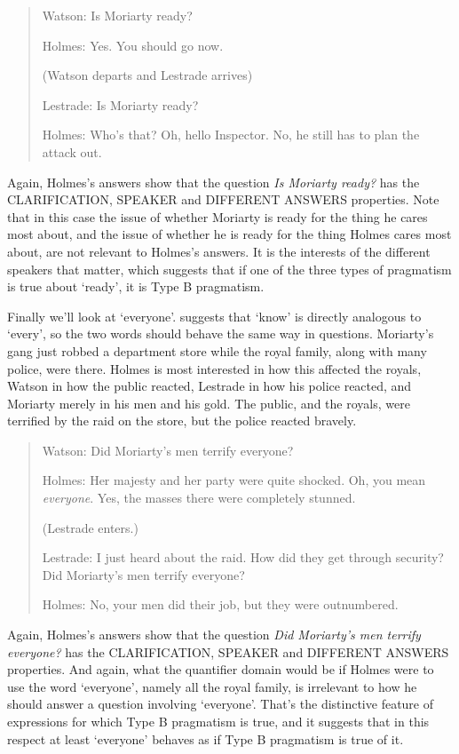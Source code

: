 \begin{quote}
Watson: Is Moriarty ready?

Holmes: Yes. You should go now.

(Watson departs and Lestrade arrives)

Lestrade: Is Moriarty ready?

Holmes: Who's that? Oh, hello Inspector. No, he still has to plan the attack out.
\end{quote}

\noindent Again, Holmes's answers show that the question \textit{Is Moriarty ready?} has the CLARIFICATION, SPEAKER and DIFFERENT ANSWERS properties. Note that in this case the issue of whether Moriarty is ready for the thing he cares most about, and the issue of whether he is ready for the thing Holmes cares most about, are not relevant to Holmes's answers. It is the interests of the different speakers that matter, which suggests that if one of the three types of pragmatism is true about `ready', it is Type B pragmatism.

Finally we'll look at `everyone'. \citet{Lewis1996b} suggests that `know' is directly analogous to `every', so the two words should behave the same way in questions. Moriarty's gang just robbed a department store while the royal family, along with many police, were there. Holmes is most interested in how this affected the royals, Watson in how the public reacted, Lestrade in how his police reacted, and Moriarty merely in his men and his gold. The public, and the royals, were terrified by the raid on the store, but the police reacted bravely.

\begin{quote}
Watson: Did Moriarty's men terrify everyone? 

Holmes: Her majesty and her party were quite shocked. Oh, you mean \textit{everyone}. Yes, the masses there were completely stunned.

(Lestrade enters.)

Lestrade: I just heard about the raid. How did they get through security? Did Moriarty's men terrify everyone?

Holmes: No, your men did their job, but they were outnumbered.
\end{quote}

\noindent Again, Holmes's answers show that the question \textit{Did Moriarty's men terrify everyone?} has the CLARIFICATION, SPEAKER and DIFFERENT ANSWERS properties. And again, what the quantifier domain would be if Holmes were to use the word `everyone', namely all the royal family, is irrelevant to how he should answer a question involving `everyone'. That's the distinctive feature of expressions for which Type B pragmatism is true, and it suggests that in this respect at least `everyone' behaves as if Type B pragmatism is true of it.



